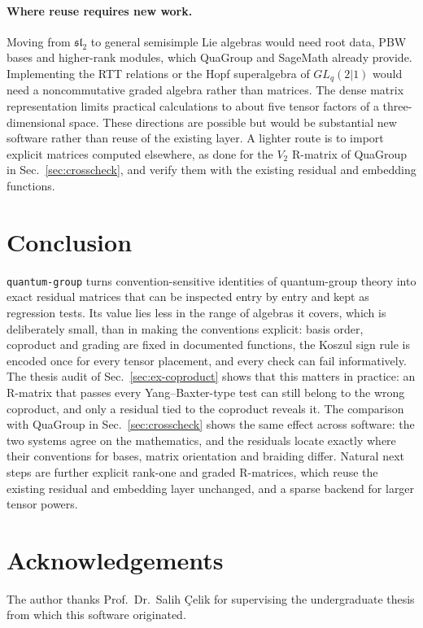 \documentclass{SciPost}
\newcommand{\pkg}{\texttt{quantum-group}}
\newcommand{\GL}{GL_q(2|1)}
\begin{document}
\paragraph{Where reuse requires new work.} Moving from $\mathfrak{sl}_2$ to general semisimple Lie algebras would need root data, PBW bases and higher-rank modules, which QuaGroup and SageMath already provide. Implementing the RTT relations or the Hopf superalgebra of $\GL$ would need a noncommutative graded algebra rather than matrices. The dense matrix representation limits practical calculations to about five tensor factors of a three-dimensional space. These directions are possible but would be substantial new software rather than reuse of the existing layer. A lighter route is to import explicit matrices computed elsewhere, as done for the $V_2$ R-matrix of QuaGroup in Sec.~\ref{sec:crosscheck}, and verify them with the existing residual and embedding functions.


\section{Conclusion}
\label{sec:conclusion}

\pkg{} turns convention-sensitive identities of quantum-group theory into exact residual matrices that can be inspected entry by entry and kept as regression tests. Its value lies less in the range of algebras it covers, which is deliberately small, than in making the conventions explicit: basis order, coproduct and grading are fixed in documented functions, the Koszul sign rule is encoded once for every tensor placement, and every check can fail informatively. The thesis audit of Sec.~\ref{sec:ex-coproduct} shows that this matters in practice: an R-matrix that passes every Yang--Baxter-type test can still belong to the wrong coproduct, and only a residual tied to the coproduct reveals it. The comparison with QuaGroup in Sec.~\ref{sec:crosscheck} shows the same effect across software: the two systems agree on the mathematics, and the residuals locate exactly where their conventions for bases, matrix orientation and braiding differ. Natural next steps are further explicit rank-one and graded R-matrices, which reuse the existing residual and embedding layer unchanged, and a sparse backend for larger tensor powers.


\section*{Acknowledgements}
The author thanks Prof.\ Dr.\ Salih Çelik for supervising the undergraduate thesis from which this software originated.
\end{document}
